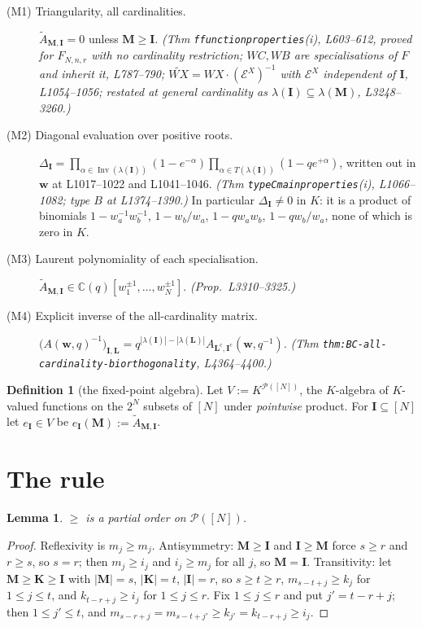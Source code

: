 \documentclass[11pt]{article}
\theoremstyle{plain}
\newtheorem{lem}[thm]{Lemma}
\theoremstyle{definition}
\newtheorem{defn}[thm]{Definition}
\theoremstyle{remark}
\newcommand{\Inv}{\operatorname{Inv}}
\newcommand{\bI}{\mathbf{I}}
\newcommand{\bM}{\mathbf{M}}
\newcommand{\bK}{\mathbf{K}}
\newcommand{\bL}{\mathbf{L}}
\newcommand{\bw}{\mathbf{w}}
\newcommand{\WXt}{\widetilde{W\!X}}
\begin{document}
\begin{description}
\item[(M1) Triangularity, all cardinalities.]  $\widetilde A_{\bM,\bI}=0$ unless
$\bM\ge\bI$.  \emph{(Thm \texttt{ffunctionproperties}(i), L603--612, proved for
$F_{N,n,r}$ with no cardinality restriction; $WC,WB$ are specialisations of $F$
and inherit it, L787--790; $\WXt=WX\cdot(\mathcal E^X)^{-1}$ with $\mathcal E^X$
independent of $\bI$, L1054--1056; restated at general cardinality as
$\lambda(\bI)\subseteq\lambda(\bM)$, L3248--3260.)}
\item[(M2) Diagonal evaluation over positive roots.]
$\Delta_{\bI}=\prod_{\alpha\in\Inv(\lambda(\bI))}(1-e^{-\alpha})
\prod_{\alpha\in T(\lambda(\bI))}(1-qe^{+\alpha})$, written out in $\bw$ at
L1017--1022 and L1041--1046.  \emph{(Thm \texttt{typeCmainproperties}(i),
L1066--1082; type $B$ at L1374--1390.)}  In particular $\Delta_{\bI}\ne0$ in
$K$: it is a product of binomials $1-w_a^{-1}w_b^{-1}$, $1-w_b/w_a$,
$1-qw_aw_b$, $1-qw_b/w_a$, none of which is zero in $K$.
\item[(M3) Laurent polynomiality of each specialisation.]
$\widetilde A_{\bM,\bI}\in\mathbb C(q)[w_1^{\pm1},\dots,w_N^{\pm1}]$.
\emph{(Prop.\ L3310--3325.)}
\item[(M4) Explicit inverse of the all-cardinality matrix.]
$\bigl(A(\bw,q)^{-1}\bigr)_{\bI,\bL}
= q^{|\lambda(\bI)|-|\lambda(\bL)|}A_{\bL^{\mathrm c},\bI^{\mathrm c}}(\bw,q^{-1})$.
\emph{(Thm \texttt{thm:BC-all-cardinality-biorthogonality}, L4364--4400.)}
\end{description}

\begin{defn}[the fixed-point algebra]
Let $V:=K^{\mathcal P([N])}$, the $K$-algebra of $K$-valued functions on the
$2^N$ subsets of $[N]$ under \emph{pointwise} product.  For $\bI\subseteq[N]$
let $e_{\bI}\in V$ be $e_{\bI}(\bM):=\widetilde A_{\bM,\bI}$.
\end{defn}

\section{The rule}

\begin{lem}\label{lem:order}
$\ge$ is a partial order on $\mathcal P([N])$.
\end{lem}

\begin{proof}
Reflexivity is $m_j\ge m_j$.  Antisymmetry: $\bM\ge\bI$ and $\bI\ge\bM$ force
$s\ge r$ and $r\ge s$, so $s=r$; then $m_j\ge i_j$ and $i_j\ge m_j$ for all $j$,
so $\bM=\bI$.  Transitivity: let $\bM\ge\bK\ge\bI$ with $|\bM|=s$, $|\bK|=t$,
$|\bI|=r$, so $s\ge t\ge r$, $m_{s-t+j}\ge k_j$ for $1\le j\le t$, and
$k_{t-r+j}\ge i_j$ for $1\le j\le r$.  Fix $1\le j\le r$ and put $j'=t-r+j$;
then $1\le j'\le t$, and
$m_{s-r+j}=m_{s-t+j'}\ge k_{j'}=k_{t-r+j}\ge i_j$.
\end{proof}
\end{document}
